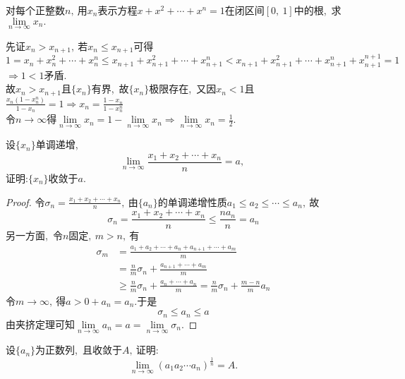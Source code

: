 \newpage
\begin{problem}
	对每个正整数$n,\ $用$x_n$表示方程$x+x^2+\cdots+x^n=1$在闭区间$[0,\ 1]$中的根,\ 求$\lim\limits_{n\rightarrow\infty}x_n.$
\end{problem}
\begin{solution}
	先证$x_n>x_{n+1},\ $若$x_{n}\leqslant x_{n+1}$可得
	$$1=x_n+x_n^2+\cdots+x_n^n\leqslant x_{n+1}+x_{n+1}^2+\cdots+x_{n+1}^n<x_{n+1}+x_{n+1}^2+\cdots+x_{n+1}^n+x_{n+1}^{n+1}=1$$
	$\Rightarrow 1<1$矛盾.\\
	故$x_n>x_{n+1}$且$\{x_n\}$有界,\ 故$\{x_n\}$极限存在,\ 又因$x_n<1$且$\frac{x_n(1-x_n^n)}{1-x_n}=1\Rightarrow x_n=\frac{1-x_n}{1-x_n^n}$\\
	令$n\rightarrow\infty$得$\lim\limits_{n\rightarrow\infty}x_n=1-\lim\limits_{n\rightarrow\infty}x_n\Rightarrow\lim\limits_{n\rightarrow\infty}x_n=\frac{1}{2}.$
\end{solution}
\newpage
\begin{problem}
	设$\{x_n\}$单调递增,\ 
	$$\lim_{n\rightarrow\infty}\frac{x_1+x_2+\cdots+x_n}{n}=a,\ $$
	证明:$\{x_n\}$收敛于$a.$
\end{problem}
\begin{proof}
	令$\sigma_n=\frac{x_1+x_2+\cdots+x_n}{n},\ $由$\{a_n\}$的单调递增性质$a_1\leqslant a_2\leqslant \cdots\leqslant a_n,\ $故
	$$\sigma_n=\frac{x_1+x_2+\cdots+x_n}{n}\leqslant\frac{na_n}{n}=a_n$$
	另一方面,\ 令$n$固定$,\ m>n,\ $有
	$$\begin{aligned}
		\sigma_m&=\frac{a_1+a_2+\cdots+a_n+a_{n+1}+\cdots+a_m}{m}\\
		&=\frac{n}{m}\sigma_n+\frac{a_{n+1}+\cdots+a_m}{m}\\
		&\geqslant\frac{n}{m}\sigma_n+\frac{a_{n}+\cdots+a_n}{m}=\frac{n}{m}\sigma_n+\frac{m-n}{m}a_n
	\end{aligned}$$
	令$m\rightarrow\infty,\ $得$a>0+a_n=a_n.$于是
	$$\sigma_n\leqslant a_n\leqslant a$$
	由夹挤定理可知$\lim\limits_{n\rightarrow\infty}a_n=a=\lim\limits_{n\rightarrow\infty}\sigma_n.$
\end{proof}
\newpage
\begin{problem}
	设$\{a_n\}$为正数列,\ 且收敛于$A,\ $证明:
	$$\lim\limits_{n\rightarrow\infty}(a_1a_2\cdots a_n)^{\frac{1}{n}}=A.$$
\end{problem}
